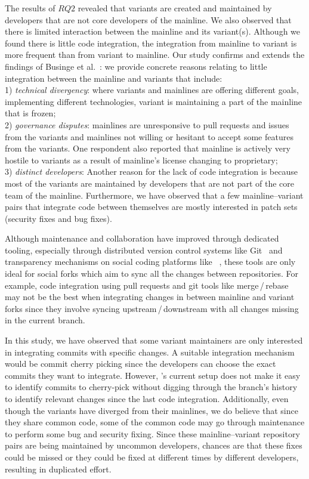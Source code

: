 The results of $RQ2$ revealed that variants are created and maintained by developers that are not core developers of the mainline.
We also observed that there is limited interaction between the mainline and its variant(s).
Although we found there is little code integration, the integration from mainline to variant is more frequent than from variant to  mainline.
Our study confirms and extends the findings of Businge et al.~\cite{businge:emse:2021}: we provide concrete reasons relating to little integration between the mainline and variants that include:\\
1) \textit{technical divergency}: where variants and mainlines are offering different goals, implementing different technologies, variant is maintaining a part of the mainline that is frozen;\\
2) \textit{governance disputes}: mainlines are unresponsive to pull requests and issues from the variants and  mainlines not willing or hesitant to accept some features from the variants. One respondent also reported that mainline is actively very hostile to variants as a result of mainline's license changing to proprietary;\\
3) \textit{distinct developers}: Another reason for the lack of code integration is because most of the variants are maintained by developers that are not part of the core team of the mainline.
Furthermore, we have observed that a few mainline--variant pairs that integrate code between themselves are mostly interested in patch sets (security fixes and bug fixes).

Although maintenance and collaboration have improved through dedicated tooling, especially through distributed version
control systems like Git~\cite{Christian:MSR:2012} and transparency mechanisms on social coding platforms like \gh~\cite{Laura:2012:CSCW}, these tools are only ideal for social forks which aim to sync all the changes between repositories.
For example, code integration using pull requests and \textsf{git} tools like  \textsf{merge\,/\,rebase} may not be the best when integrating changes in between mainline and variant forks since they involve syncing upstream\,/\,downstream with all changes missing in the current branch.

In this study, we have observed that some variant maintainers are only interested in integrating commits with specific changes.
A suitable integration mechanism would be commit cherry picking since the developers can choose the exact commits they want to integrate.
However, \gh's current setup does not make it easy to identify commits to cherry-pick without digging through the branch's history to identify relevant changes since the last code integration.
Additionally, even though the variants have diverged from their mainlines, we do believe that since they share common code, some of the common code may go through maintenance to perform some bug and security fixing. 
Since these mainline--variant repository pairs are being maintained by uncommon developers, chances are that these fixes could be missed or they could be fixed at different times by different developers, resulting in duplicated effort.

